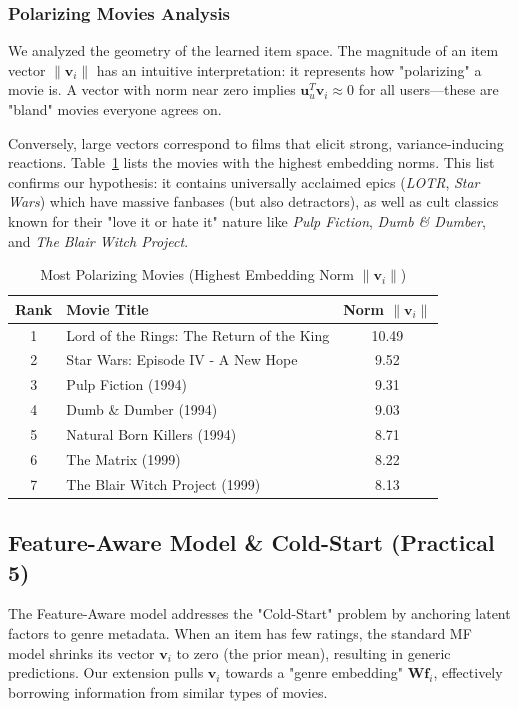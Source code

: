 \documentclass{article}
\theoremstyle{plain}
\theoremstyle{definition}
\theoremstyle{remark}
\begin{document}
\subsubsection{Polarizing Movies Analysis}
We analyzed the geometry of the learned item space. The magnitude of an item vector $\|\mathbf{v}_i\|$ has an intuitive interpretation: it represents how "polarizing" a movie is. A vector with norm near zero implies $\mathbf{u}_u^T \mathbf{v}_i \approx 0$ for all users—these are "bland" movies everyone agrees on.

Conversely, large vectors correspond to films that elicit strong, variance-inducing reactions. Table~\ref{tab:polarizing} lists the movies with the highest embedding norms. This list confirms our hypothesis: it contains universally acclaimed epics (\textit{LOTR}, \textit{Star Wars}) which have massive fanbases (but also detractors), as well as cult classics known for their "love it or hate it" nature like \textit{Pulp Fiction}, \textit{Dumb \& Dumber}, and \textit{The Blair Witch Project}.

\begin{table}[h]
\centering
\caption{Most Polarizing Movies (Highest Embedding Norm $\|\mathbf{v}_i\|$)}
\label{tab:polarizing}
\begin{tabular}{c p{6cm} c}
\hline
\textbf{Rank} & \textbf{Movie Title} & \textbf{Norm} $\|\mathbf{v}_i\|$ \\ \hline
1 & Lord of the Rings: The Return of the King & 10.49 \\
2 & Star Wars: Episode IV - A New Hope & 9.52 \\
3 & Pulp Fiction (1994) & 9.31 \\
4 & Dumb \& Dumber (1994) & 9.03 \\
5 & Natural Born Killers (1994) & 8.71 \\
6 & The Matrix (1999) & 8.22 \\
7 & The Blair Witch Project (1999) & 8.13 \\ \hline
\end{tabular}
\end{table}




\subsection{Feature-Aware Model & Cold-Start (Practical 5)}
The Feature-Aware model addresses the "Cold-Start" problem by anchoring latent factors to genre metadata. When an item has few ratings, the standard MF model shrinks its vector $\mathbf{v}_i$ to zero (the prior mean), resulting in generic predictions. Our extension pulls $\mathbf{v}_i$ towards a "genre embedding" $\mathbf{W}\mathbf{f}_i$, effectively borrowing information from similar types of movies.
\end{document}

